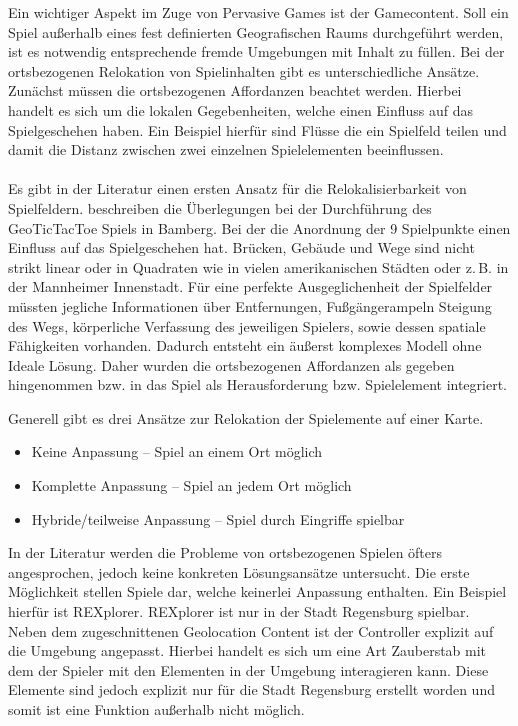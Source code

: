 Ein wichtiger Aspekt im Zuge von Pervasive Games ist der Gamecontent. Soll ein Spiel außerhalb eines fest definierten Geografischen Raums durchgeführt werden, ist es notwendig entsprechende fremde Umgebungen mit Inhalt zu füllen.\cite{Montola.2005} 
Bei der ortsbezogenen Relokation von Spielinhalten gibt es unterschiedliche Ansätze.
Zunächst müssen die ortsbezogenen Affordanzen beachtet werden. Hierbei handelt es sich um die lokalen Gegebenheiten, welche einen Einfluss auf das Spielgeschehen haben. Ein Beispiel hierfür sind Flüsse die ein Spielfeld teilen und damit die Distanz zwischen zwei einzelnen Spielelementen beeinflussen.
\\\\
Es gibt in der Literatur einen ersten Ansatz für die Relokalisierbarkeit von Spielfeldern.
\textcite{Kiefer.2005} beschreiben die Überlegungen bei der Durchführung des GeoTicTacToe Spiels in Bamberg. Bei der die Anordnung der 9 Spielpunkte einen Einfluss auf das Spielgeschehen hat. Brücken, Gebäude und Wege sind nicht strikt linear oder in Quadraten wie in vielen amerikanischen Städten oder z.\,B. in der Mannheimer Innenstadt. Für eine perfekte Ausgeglichenheit der Spielfelder müssten jegliche Informationen über Entfernungen, Fußgängerampeln Steigung des Wegs, körperliche Verfassung des jeweiligen Spielers, sowie dessen spatiale Fähigkeiten vorhanden. Dadurch entsteht ein äußerst komplexes Modell ohne Ideale Lösung. Daher wurden die ortsbezogenen Affordanzen als gegeben hingenommen bzw. in das Spiel als Herausforderung bzw. Spielelement integriert.

Generell gibt es drei Ansätze zur Relokation der Spielemente auf einer Karte.

\begin{itemize}
\item Keine Anpassung -- Spiel an einem Ort möglich
\item Komplette Anpassung -- Spiel an jedem Ort möglich
\item Hybride/teilweise Anpassung -- Spiel durch Eingriffe spielbar
\end{itemize}

In der Literatur werden die Probleme von ortsbezogenen Spielen öfters angesprochen, jedoch keine konkreten Lösungsansätze untersucht.
Die erste Möglichkeit stellen Spiele dar, welche keinerlei Anpassung enthalten.
Ein Beispiel hierfür ist REXplorer.\cite{Ballagas.2007} REXplorer ist nur in der Stadt Regensburg spielbar. Neben dem zugeschnittenen Geolocation Content ist der Controller explizit auf die Umgebung angepasst.
Hierbei handelt es sich um eine Art Zauberstab mit dem der Spieler mit den Elementen in der Umgebung interagieren kann. Diese Elemente sind jedoch explizit nur für die Stadt Regensburg erstellt worden und somit ist eine Funktion außerhalb nicht möglich.

